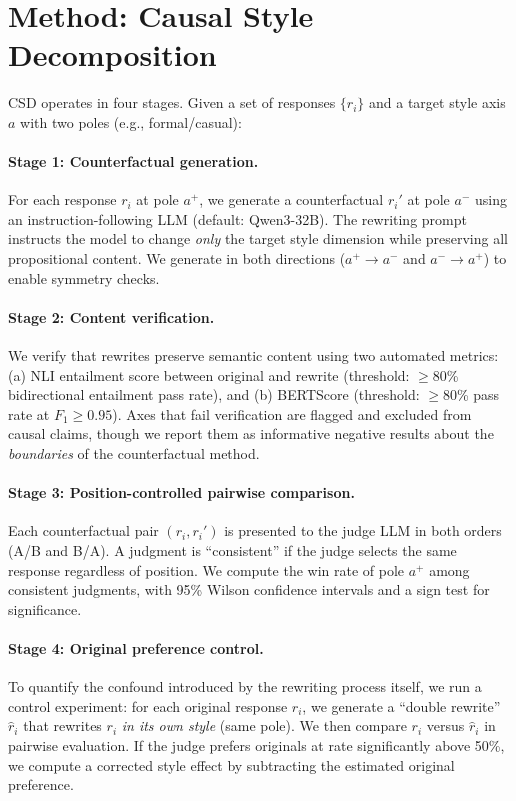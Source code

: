 \documentclass[11pt,a4paper]{article}
\begin{document}
\section{Method: Causal Style Decomposition}
\label{sec:method}

CSD operates in four stages. Given a set of responses $\{r_i\}$ and a target style axis $a$ with two poles (e.g., formal/casual):

\paragraph{Stage 1: Counterfactual generation.}
For each response $r_i$ at pole $a^+$, we generate a counterfactual $r_i'$ at pole $a^-$ using an instruction-following LLM (default: Qwen3-32B).
The rewriting prompt instructs the model to change \emph{only} the target style dimension while preserving all propositional content.
We generate in both directions ($a^+ \to a^-$ and $a^- \to a^+$) to enable symmetry checks.

\paragraph{Stage 2: Content verification.}
We verify that rewrites preserve semantic content using two automated metrics:
(a) NLI entailment score between original and rewrite (threshold: $\geq$80\% bidirectional entailment pass rate), and
(b) BERTScore (threshold: $\geq$80\% pass rate at $F_1 \geq 0.95$).
Axes that fail verification are flagged and excluded from causal claims, though we report them as informative negative results about the \emph{boundaries} of the counterfactual method.

\paragraph{Stage 3: Position-controlled pairwise comparison.}
Each counterfactual pair $(r_i, r_i')$ is presented to the judge LLM in both orders (A/B and B/A).
A judgment is ``consistent'' if the judge selects the same response regardless of position.
We compute the win rate of pole $a^+$ among consistent judgments, with 95\% Wilson confidence intervals and a sign test for significance.

\paragraph{Stage 4: Original preference control.}
To quantify the confound introduced by the rewriting process itself, we run a control experiment: for each original response $r_i$, we generate a ``double rewrite'' $\hat{r}_i$ that rewrites $r_i$ \emph{in its own style} (same pole).
We then compare $r_i$ versus $\hat{r}_i$ in pairwise evaluation.
If the judge prefers originals at rate significantly above 50\%, we compute a corrected style effect by subtracting the estimated original preference.
\end{document}
